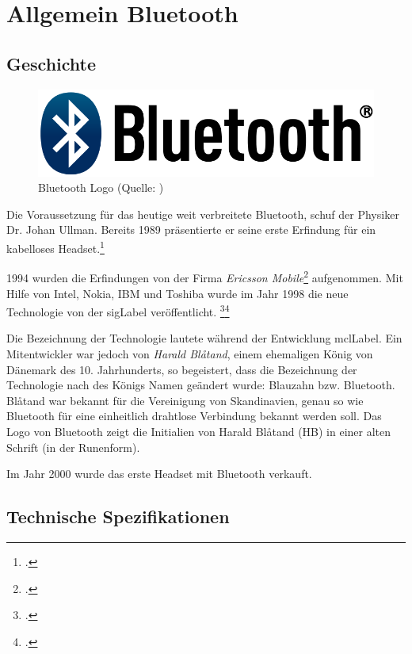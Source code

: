 \chapter{Allgemein Bluetooth}
\label{ch:general}

\section{Geschichte}

\begin{figure}
	\includegraphics[width=1.0\linewidth]{images/bluetooth_logo.png}
	\caption[Bluetooth Logo]{Bluetooth Logo (Quelle: )}
\end{figure}
Die Voraussetzung für das heutige weit verbreitete Bluetooth, schuf der Physiker Dr. Johan Ullman.
Bereits 1989 präsentierte er seine erste Erfindung für ein kabelloses Headset.\footcite{Bluetooth_Wikipedia_2015-04-17}

1994 wurden die Erfindungen von der Firma \textit{Ericsson Mobile}\footcite{Ericsson_2015-04-17} aufgenommen.
Mit Hilfe von Intel, Nokia, IBM und Toshiba wurde im Jahr 1998 die neue Technologie von der \gls{sigLabel} veröffentlicht.
\footcite{Bluetooth_Special_Interest_Group_Wikipedia_2015-04-17}\footcite{The_history_of_Bluetooth_Ericsson_History_2015-04-17}

Die Bezeichnung der Technologie lautete während der Entwicklung \gls{mclLabel}.
Ein Mitentwickler war jedoch von \textit{Harald Bl{\aa}tand}, einem ehemaligen König von Dänemark des 10. Jahrhunderts, so begeistert, dass die Bezeichnung der Technologie nach des Königs Namen geändert wurde: Blauzahn bzw. Bluetooth.
Bl{\aa}tand war bekannt für die Vereinigung von Skandinavien, genau so wie Bluetooth für eine einheitlich drahtlose Verbindung bekannt werden soll.
Das Logo von Bluetooth zeigt die Initialien von Harald Bl{\aa}tand (HB) in einer alten Schrift (in der Runenform).

Im Jahr 2000 wurde das erste Headset mit Bluetooth verkauft.

\section{Technische Spezifikationen}
\label{sec:general_specs}

